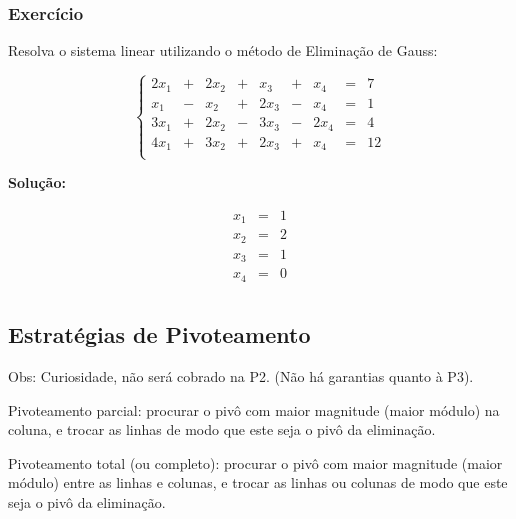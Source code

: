 \documentclass[a4paper]{article}
\begin{document}
\subsubsection*{Exercício}

Resolva o sistema linear utilizando o método de Eliminação de Gauss:

\begin{displaymath}
  \left\{
    \begin{array}{ccccccccc}
      2 x_1 &+& 2 x_2  &+&  x_3 &+& x_4 &=&7\\
      x_1 &-& x_2 &+& 2 x_3 &-& x_4 &=&1\\
      3 x_1 &+& 2 x_2 &-& 3 x_3 &-& 2 x_4&=& 4\\
      4 x_1 &+& 3 x_2  &+& 2 x_3 &+& x_4 &=&12\\
    \end{array}
\right.
\end{displaymath}

{\bf Solução:}

\begin{displaymath}
  \begin{array}{ccc}
      x_1 &=& 1\\
      x_2 &=& 2\\
      x_3 &=& 1\\
      x_4 &=& 0\\
  \end{array}
\end{displaymath}


\subsection*{Estratégias de Pivoteamento}

Obs: Curiosidade, não será cobrado na P2. (Não há garantias quanto à P3).

Pivoteamento parcial: procurar o pivô com maior magnitude (maior
módulo) na coluna, e trocar as linhas de modo que este seja o pivô da
eliminação.

Pivoteamento total (ou completo): procurar o pivô com maior magnitude
(maior módulo) entre as linhas e colunas, e trocar as linhas ou
colunas de modo que este seja o pivô da eliminação.
\end{document}
